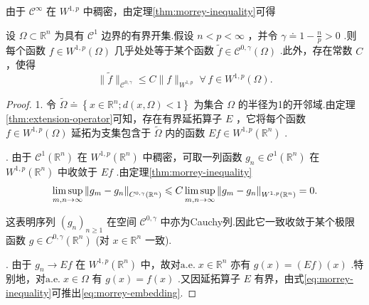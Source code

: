 由于 ${\mathcal{C}}^{\infty }$ 在 ${W}^{1,p}$ 中稠密，由定理\ref{thm:morrey-inequality}可得

\begin{corollary}[嵌入]\label{cor:morrey-embedding}
设 $\Omega  \subset  {\mathbb{R}}^{n}$ 为具有 ${\mathcal{C}}^{1}$ 边界的有界开集.假设 $n < p < \infty$ ，并令 $\gamma  \doteq  1 - \frac{n}{p} > 0$ .则每个函数 $f \in  {W}^{1,p}\left( \Omega \right)$ 几乎处处等于某个函数 $\widetilde{f} \in  {\mathcal{C}}^{0,\gamma }\left( \Omega \right)$ .此外，存在常数 $C$ ，使得
\begin{equation}\tag{8.56}\label{eq:morrey-embedding}
\| \widetilde{f}{\| }_{{\mathcal{C}}^{0,\gamma }} \leq  C\| f{\| }_{{W}^{1,p}}\;\forall\,f \in  {W}^{1,p}\left( \Omega \right) .
\end{equation}
\end{corollary}

\begin{proof}
1. 令 $\widetilde{\Omega } \doteq  \left\{  {x \in  {\mathbb{R}}^{n};d\left( {x,\Omega }\right)  < 1}\right\}$ 为集合 $\Omega$ 的半径为1的开邻域.由定理\ref{thm:extension-operator}可知，存在有界延拓算子 $E$ ，它将每个函数 $f \in  {W}^{1,p}\left( \Omega \right)$ 延拓为支集包含于 $\widetilde{\Omega }$ 内的函数 ${Ef} \in  {W}^{1,p}\left( {\mathbb{R}}^{n}\right)$ .

. 由于 ${\mathcal{C}}^{1}\left( {\mathbb{R}}^{n}\right)$ 在 ${W}^{1,p}\left( {\mathbb{R}}^{n}\right)$ 中稠密，可取一列函数 ${g}_{n} \in  {\mathcal{C}}^{1}\left( {\mathbb{R}}^{n}\right)$ 在 ${W}^{1,p}\left( {\mathbb{R}}^{n}\right)$ 中收敛于 ${Ef}$ .由定理\ref{thm:morrey-inequality}
\[
\limsup_{{m,n \rightarrow  \infty }}{\norm{g_{m} - {g}_{n}}}_{{C}^{0,\gamma }\left( {\mathbb{R}}^{n}\right) } \leqslant  C\limsup_{{m,n \rightarrow  \infty }}{\norm{g_{m} - {g}_{n}}}_{{W}^{1,p}\left( {\mathbb{R}}^{n}\right) } = 0.
\]

这表明序列 ${\left( {g}_{n}\right) }_{n \geq  1}$ 在空间 ${\mathcal{C}}^{0,\gamma }$ 中亦为Cauchy列.因此它一致收敛于某个极限函数 $g \in  {C}^{0,\gamma }\left( {\mathbb{R}}^{n}\right)$ (对 $x \in  {\mathbb{R}}^{n}$ 一致).

. 由于 ${g}_{n} \rightarrow  {Ef}$ 在 ${W}^{1,p}\left( {\mathbb{R}}^{n}\right)$ 中，故对$\text{a.e.}\; x \in  {\mathbb{R}}^{n}$ 亦有 $g\left( x\right)  = \left( {Ef}\right) \left( x\right)$ .特别地，对$\text{a.e.}\;x \in  \Omega$ 有 $g\left( x\right)  = f\left( x\right)$ .又因延拓算子 $E$ 有界，由式\eqref{eq:morrey-inequality}可推出\eqref{eq:morrey-embedding}.
\end{proof}

